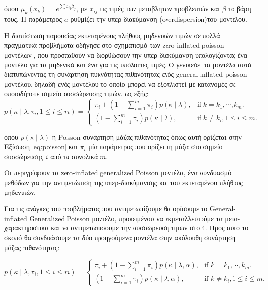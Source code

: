 όπου $\mu_k(x_k) = e^{\sum_{}^{} x_{ij} \beta_j}$, με $x_{ij}$ τις τιμές των μεταβλητών προβλεπτών και $\beta$ τα βάρη τους. Η παράμετρος $\alpha$ ρυθμίζει την υπερ-διακύμανση (overdispersion)του μοντέλου.

Η διαπίστωση παρουσίας εκτεταμένους πλήθους μηδενικών τιμών σε πολλά πραγματικά προβλήματα οδήγησε στο σχηματισμό των zero-inflated poisson μοντέλων \citep{Lambert:1992:ZPR:149268.149270}, που προσπαθούν να διορθώσουν την υπερ-διακύμανση υπολογίζοντας ένα μοντέλο για τα μηδενικά και ένα για τις υπόλοιπες τιμές. Ο \citet{gip} γενικεύει τα μοντέλα αυτά διατυπώνοντας τη συνάρτηση πυκνότητας πιθανότητας ενός general-inflated poisson μοντέλου, δηλαδή ενός μοντέλου το οποίο μπορεί να εξοπλιστεί με κατανομές σε οποιοδήποτε σημείο συσσώρευσης τιμών, ως εξής: 
\begin{equation}
 p(\kappa \mid \lambda, \pi_i, 1 \leq i \leq m) = \begin{cases}
 \pi_i + (1-\sum_{i=1}^{m} \pi_i) p(\kappa \mid \lambda) , & \text{if $k=k_1, \cdots, k_m$}.\\
 (1-\sum_{i=1}^{m} \pi_i) p(\kappa \mid \lambda), & \text{if $k \neq k_i, 1 \leq i \leq m$}.
 \end{cases}
\end{equation}

όπου $p(\kappa \mid \lambda)$ η Poisson συνάρτηση μάζας πιθανότητας όπως αυτή ορίζεται στην Εξίσωση \ref{eq:poisson} και $\pi_i$ μία παράμετρος που ορίζει τη μάζα στο σημείο συσσώρευσης $i$ από τα συνολικά $m$.

Οι \citet{Famoye_onthe} περιγράφουν τα zero-inflated generalized Poisson μοντέλα, ένα συνδυασμό μεθόδων για την αντιμετώπιση της υπερ-διακύμανσης και του εκτεταμένου πλήθους μηδενικών. 

Για τις ανάγκες του προβλήματος που αντιμετωπίζουμε θα ορίσουμε το General-inflated Generalized Poisson μοντέλο, προκειμένου να εκμεταλλευτούμε τα μετα-χαρακτηριστικά και να αντιμετωπίσουμε την συσσώρευση τιμών στο 4. Προς αυτό το σκοπό θα συνδυάσουμε τα δύο προηγούμενα μοντέλα στην ακόλουθη συνάρτηση μάζας πιθανότητας:

\begin{equation}
 p(\kappa \mid \lambda, \pi_i, 1 \leq i \leq m) = \begin{cases}
 \pi_i + (1-\sum_{i=1}^{m} \pi_i) p(\kappa \mid \lambda, \alpha) , & \text{if $k=k_1, \cdots, k_m$}.\\
 (1-\sum_{i=1}^{m} \pi_i) p(\kappa \mid \lambda, \alpha), & \text{if $k \neq k_i, 1 \leq i \leq m$}.
 \end{cases}
\end{equation} 
 
